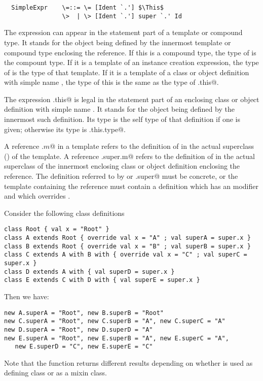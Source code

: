 \documentclass[11pt]{report}
\begin{document}
\syntax\begin{verbatim}
  SimpleExpr    \=::= \= [Ident `.'] $\This$
                \>  | \> [Ident `.'] super `.' Id
\end{verbatim}

The expression \verb@this@ can appear in the statement part of a
template or compound type. It stands for the object being defined by
the innermost template or compound type enclosing the reference. If
this is a compound type, the type of \verb@this@ is the compount type.
If it is a template of an instance creation expression, the type of
\verb@this@ is the type of that template. If it is a template of a
class or object definition with simple name \verb@C@, the type of this
is the same as the type of \verb@C.this@.

The expression \verb@C.this@ is legal in the statement part of an
enclosing class or object definition with simple name \verb@C@. It
stands for the object being defined by the innermost such definition.
Its type is the self type of that definition if one is given;
otherwise its type is \verb@C.this.type@.

A reference \verb@super.$m$@ in a template refers to the definition of
\verb@m@ in the actual superclass () of the
template.  A reference \verb@C.super.m@ refers to the definition of
\verb@m@ in the actual superclass of the innermost enclosing class or
object definition enclosing the reference. The definition referred to
by \verb@super@ or \verb@C.super@ must be concrete, or the template
containing the reference must contain a definition which has an
\verb@override@ modifier and which overrides \verb@m@.

\example\label{ex:super}
Consider the following class definitions

\begin{verbatim}
class Root { val x = "Root" }
class A extends Root { override val x = "A" ; val superA = super.x }
class B extends Root { override val x = "B" ; val superB = super.x }
class C extends A with B with { override val x = "C" ; val superC = super.x }
class D extends A with { val superD = super.x }
class E extends C with D with { val superE = super.x }
\end{verbatim}
Then we have:
\begin{verbatim}
new A.superA = "Root", new B.superB = "Root"
new C.superA = "Root", new C.superB = "A", new C.superC = "A"
new D.superA = "Root", new D.superD = "A"
new E.superA = "Root", new E.superB = "A", new E.superC = "A",
   new E.superD = "C", new E.superE = "C"
\end{verbatim}
Note that the \verb@superB@ function returns different results
depending on whether \verb@B@ is used as defining class or as a mixin class.
\end{document}
